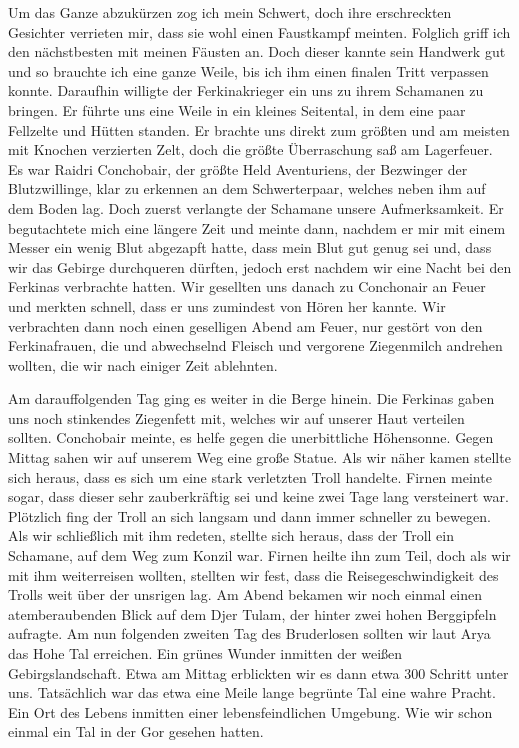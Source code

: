 Um das Ganze abzukürzen zog ich mein Schwert, doch ihre erschreckten Gesichter verrieten mir, dass sie wohl einen Faustkampf meinten. Folglich griff ich den nächstbesten mit meinen Fäusten an. Doch dieser kannte sein Handwerk gut und so brauchte ich eine ganze Weile, bis ich ihm einen finalen Tritt verpassen konnte. Daraufhin willigte der Ferkinakrieger ein uns zu ihrem Schamanen zu bringen. Er führte uns eine Weile in ein kleines Seitental, in dem eine paar Fellzelte und Hütten standen. Er brachte uns direkt zum größten und am meisten mit Knochen verzierten Zelt, doch die größte Überraschung saß am Lagerfeuer. Es war Raidri Conchobair, der größte Held Aventuriens, der Bezwinger der Blutzwillinge, klar zu erkennen an dem Schwerterpaar, welches neben ihm auf dem Boden lag. Doch zuerst verlangte der Schamane unsere Aufmerksamkeit. Er begutachtete mich eine längere Zeit und meinte dann, nachdem er mir mit einem Messer ein wenig Blut abgezapft hatte, dass mein Blut gut genug sei und, dass wir das Gebirge durchqueren dürften, jedoch erst nachdem wir eine Nacht bei den Ferkinas verbrachte hatten. Wir gesellten uns danach zu Conchonair an Feuer und merkten schnell, dass er uns zumindest von Hören her kannte. Wir verbrachten dann noch einen geselligen Abend am Feuer, nur gestört von den Ferkinafrauen, die und abwechselnd Fleisch und vergorene Ziegenmilch andrehen wollten, die wir nach einiger Zeit ablehnten.

Am darauffolgenden Tag ging es weiter in die Berge hinein. Die Ferkinas gaben uns noch stinkendes Ziegenfett mit, welches wir auf unserer Haut verteilen sollten. Conchobair meinte, es helfe gegen die unerbittliche Höhensonne. Gegen Mittag sahen wir auf unserem Weg eine große Statue. Als wir näher kamen stellte sich heraus, dass es sich um eine stark verletzten Troll handelte. Firnen meinte sogar, dass dieser sehr zauberkräftig sei und keine zwei Tage lang versteinert war. Plötzlich fing der Troll an sich langsam und dann immer schneller zu bewegen. Als wir schließlich mit ihm redeten, stellte sich heraus, dass der Troll ein Schamane, auf dem Weg zum Konzil war. Firnen heilte ihn zum Teil, doch als wir mit ihm weiterreisen wollten, stellten wir fest, dass die Reisegeschwindigkeit des Trolls weit über der unsrigen lag. Am Abend bekamen wir noch einmal einen atemberaubenden Blick auf dem Djer Tulam, der hinter zwei hohen Berggipfeln aufragte. Am nun folgenden zweiten Tag des Bruderlosen sollten wir laut Arya das Hohe Tal erreichen. Ein grünes Wunder inmitten der weißen Gebirgslandschaft. Etwa am Mittag erblickten wir es dann etwa 300 Schritt unter uns. Tatsächlich war das etwa eine Meile lange begrünte Tal eine wahre Pracht. Ein Ort des Lebens inmitten einer lebensfeindlichen Umgebung. Wie wir schon einmal ein Tal in der Gor gesehen hatten.

